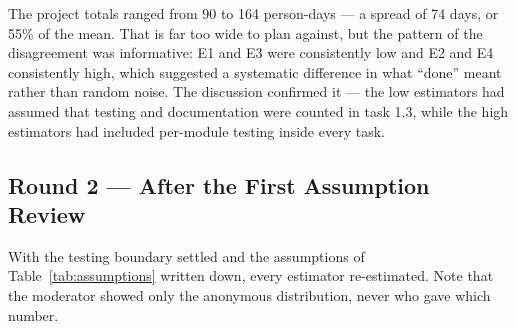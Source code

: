 \documentclass[11pt,a4paper]{report}
\begin{document}
The project totals ranged from 90 to 164 person-days --- a spread of
74 days, or 55\% of the mean. That is far too wide to plan
against, but the pattern of the disagreement was informative: E1 and E3 were
consistently low and E2 and E4 consistently high, which suggested a systematic
difference in what ``done'' meant rather than random noise. The discussion
confirmed it --- the low estimators had assumed that testing and documentation
were counted in task 1.3, while the high estimators had included per-module
testing inside every task.

\subsection{Round 2 --- After the First Assumption Review}

With the testing boundary settled and the assumptions of
Table~\ref{tab:assumptions} written down, every estimator re-estimated. Note that
the moderator showed only the anonymous distribution, never who gave which
number.
\end{document}
